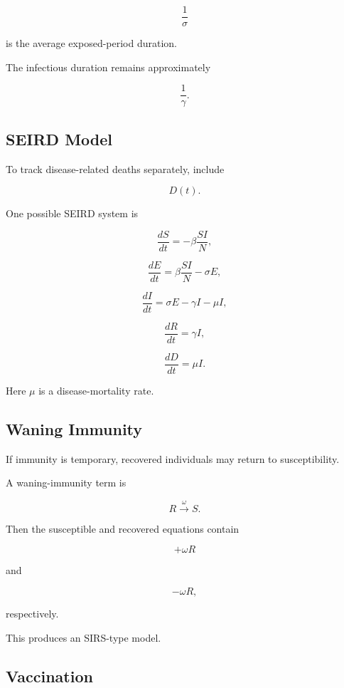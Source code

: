 \[
\boxed{
\frac{1}{\sigma}
}
\]

is the average exposed-period duration.

The infectious duration remains approximately

\[
\boxed{
\frac{1}{\gamma}.
}
\]

\subsection{SEIRD Model}
\label{subsec:seird-model}

To track disease-related deaths separately, include

\[
\boxed{
D(t).
}
\]

One possible SEIRD system is

\[
\frac{dS}{dt}
=
-\beta\frac{SI}{N},
\]

\[
\frac{dE}{dt}
=
\beta\frac{SI}{N}
-
\sigma E,
\]

\[
\frac{dI}{dt}
=
\sigma E
-
\gamma I
-
\mu I,
\]

\[
\frac{dR}{dt}
=
\gamma I,
\]

\[
\boxed{
\frac{dD}{dt}
=
\mu I.
}
\]

Here \(\mu\) is a disease-mortality rate.

\subsection{Waning Immunity}
\label{subsec:waning-immunity}

If immunity is temporary, recovered individuals may return to susceptibility.

A waning-immunity term is

\[
\boxed{
R
\xrightarrow{\omega}
S.
}
\]

Then the susceptible and recovered equations contain

\[
+\omega R
\]

and

\[
-\omega R,
\]

respectively.

This produces an SIRS-type model.

\subsection{Vaccination}
\label{subsec:epidemic-vaccination}

